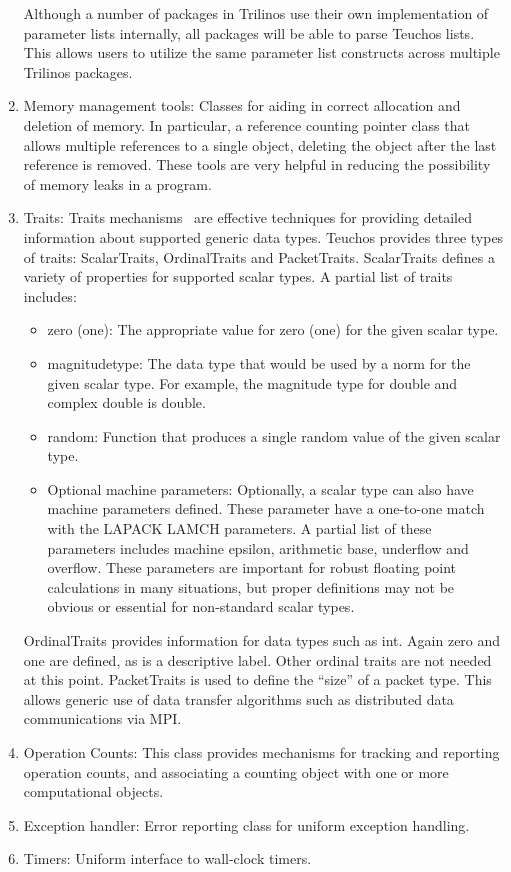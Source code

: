 \documentclass[acmtoms,acmnow]{acmtrans2m}
\begin{document}
\begin{enumerate}
Although a number of packages in Trilinos use their own implementation
of parameter lists internally, all packages will be able to parse
Teuchos lists.  This allows users to utilize the same parameter list
constructs across multiple Trilinos packages.

\item Memory management tools:  Classes for aiding in correct allocation 
and deletion of memory.  In particular, a reference counting pointer class that 
allows multiple references to a single object, deleting the object after the last
reference is removed.  These tools are very helpful in reducing the possibility of
memory leaks in a program.

\item Traits: Traits mechanisms~\cite{MyersTraits} are effective techniques
for providing detailed information about supported generic data types.
Teuchos provides three types of traits: ScalarTraits, OrdinalTraits
and PacketTraits.
ScalarTraits defines a variety of properties for supported scalar
types.  A partial list of traits includes:
\begin{itemize}
\item zero (one): The appropriate value for zero (one) for the given
scalar type.
\item magnitudetype: The data type that would be used by a norm for
the given scalar type.  For example, the magnitude type for double and
complex double is double.
\item random: Function that produces a single random value of the
given scalar type.
\item Optional machine parameters: Optionally, a scalar type can also
have machine parameters defined.  These parameter have a one-to-one
match with the LAPACK LAMCH parameters.  A partial list of these
parameters includes machine epsilon, arithmetic base, underflow and
overflow.  These parameters are important for robust floating point
calculations in many situations, but proper definitions may not be
obvious or essential for non-standard scalar types.
\end{itemize}

OrdinalTraits provides information for data types such as int.  Again
zero and one are defined, as is a descriptive label.  Other ordinal traits are
not needed at this point.  PacketTraits is used to define the ``size''
of a packet type.  This
allows generic use of data transfer algorithms such as
distributed data communications via MPI.

\item Operation Counts: This class provides mechanisms for tracking
and reporting operation counts, and associating a counting object with
one or more computational objects.

\item Exception handler:  Error reporting class for uniform exception
handling.

\item Timers:  Uniform interface to wall-clock timers.

\end{enumerate}
\end{document}
